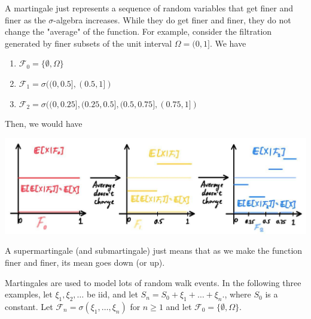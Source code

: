 \documentclass{article}
\theoremstyle{definition}
\theoremstyle{remark}
\theoremstyle{definition}
\begin{document}
  A martingale just represents a sequence of random variables that get finer and finer as the $\sigma$-algebra increases. While they do get finer and finer, they do not change the "average" of the function. For example, consider the filtration generated by finer subsets of the unit interval $\Omega = (0, 1]$. We have 

  \begin{enumerate}
    \item $\mathcal{F}_0 = \{\emptyset, \Omega\}$ 
    \item $\mathcal{F}_1 = \sigma( (0, 0.5], (0.5, 1])$ 
    \item $\mathcal{F}_2 = \sigma( (0, 0.25], (0.25, 0.5], (0.5, 0.75], (0.75, 1] )$
  \end{enumerate}

  Then, we would have 

  \begin{center}
    \includegraphics[scale=0.3]{img/martingale_increments.jpg}
  \end{center}
  
  A supermartingale (and submartingale) just means that as we make the function finer and finer, its mean goes down (or up). 


  Martingales are used to model lots of random walk events. In the following three examples, let $\xi_1, \xi_2, \ldots$ be iid, and let $S_n = S_0 + \xi_1 + \ldots + \xi_n$., where $S_0$ is a constant. Let $\mathcal{F}_n = \sigma(\xi_1, \ldots, \xi_n)$ for $n \geq 1$ and let $\mathcal{F}_0 = \{\emptyset, \Omega\}$. 
\end{document}
